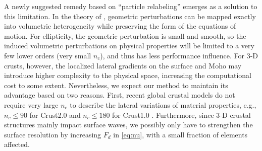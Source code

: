\documentclass[extra]{gji}
\begin{document}
A newly suggested remedy based on ``particle relabeling'' 
\cite[]{attar2016particle} emerges as a solution to this limitation.
In the theory of \cite{attar2016particle}, geometric perturbations can be mapped exactly into 
volumetric heterogeneity while preserving the form of the equations of motion. 
For ellipticity, the geometric perturbation is small and smooth, 
so the induced volumetric perturbations on physical properties will be
limited to a very few lower orders (very small $n_c$), and thus has less
performance influence. For 3-D crusts, however, the localized
lateral gradients on the surface and Moho may introduce higher complexity
to the physical space, increasing the computational cost to some extent. 
Nevertheless, we expect our method to maintain its advantage based on two reasons. 
First, recent global crustal models do not require very large $n_c$ to describe 
the lateral variations of material properties,
e.g., $n_c\le90$ for Crust2.0 \cite[]{bassin2000current} and
$n_c\le180$ for Crust1.0 \cite[]{laske2013update}. 
Furthermore, since 3-D crustal structures mainly impact surface waves, 
we possibly only have to strengthen the surface resolution by increasing $F_d$ 
in \eqref{eq:nu}, with a small fraction of elements affected.
\end{document}
